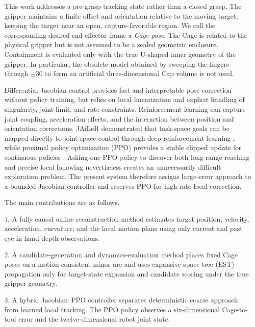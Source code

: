\documentclass[conference]{IEEEtran}
\begin{document}
This work addresses a pre-grasp tracking state rather than a closed grasp. The gripper maintains a finite offset and orientation relative to the moving target, keeping the target near an open, capture-favorable region. We call the corresponding desired end-effector frame a \emph{Cage pose}. The Cage is related to the physical gripper but is not assumed to be a sealed geometric enclosure. Containment is evaluated only with the true U-shaped inner geometry of the gripper. In particular, the obsolete model obtained by sweeping the fingers through $\pm$30\textdegree{} to form an artificial three-dimensional Cap volume is not used.

Differential Jacobian control provides fast and interpretable pose correction without policy training, but relies on local linearization and explicit handling of singularity, joint-limit, and rate constraints. Reinforcement learning can capture joint coupling, acceleration effects, and the interaction between position and orientation corrections. JAiLeR demonstrated that task-space goals can be mapped directly to joint-space control through deep reinforcement learning \cite{ref4}, while proximal policy optimization (PPO) provides a stable clipped update for continuous policies \cite{ref5}. Asking one PPO policy to discover both long-range reaching and precise local following nevertheless creates an unnecessarily difficult exploration problem. The present system therefore assigns large-error approach to a bounded Jacobian controller and reserves PPO for high-rate local correction.

The main contributions are as follows.

1. A fully causal online reconstruction method estimates target position, velocity, acceleration, curvature, and the local motion plane using only current and past eye-in-hand depth observations.\par

2. A candidate-generation and dynamics-evaluation method places fixed Cage poses on a motion-consistent minor arc and uses expansive-space-tree (EST) propagation only for target-state expansion and candidate scoring under the true gripper geometry.\par

3. A hybrid Jacobian--PPO controller separates deterministic coarse approach from learned local tracking. The PPO policy observes a six-dimensional Cage-to-tool error and the twelve-dimensional robot joint state.\par
\end{document}
